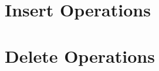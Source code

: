 \documentclass{ldbc}
\begin{document}


\section{Insert Operations}
\label{sec:insert-operations}



\section{Delete Operations}
\label{sec:delete-operations}



\printbibliography
\end{document}
